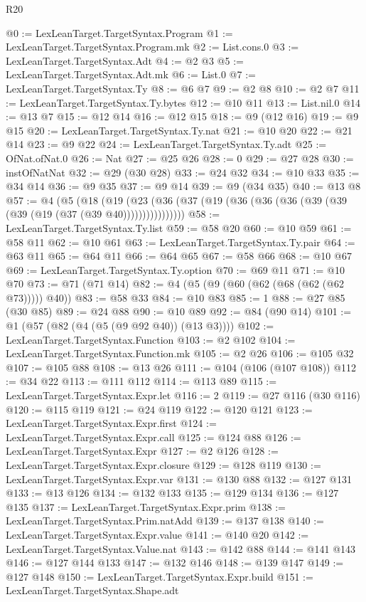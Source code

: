 \begin{lexlean}{R20}
\begin{coremodule}
{{{{{{{{{{{{{{{{{{{{{{{{{{{{{{{{{{{{{{{{{{{{{{{{{{{{{{{{{{{{{{{@0 := LexLeanTarget.TargetSyntax.Program
@1 := LexLeanTarget.TargetSyntax.Program.mk
@2 := List.cons.{0}
@3 := LexLeanTarget.TargetSyntax.Adt
@4 := @2 @3
@5 := LexLeanTarget.TargetSyntax.Adt.mk
@6 := List.{0}
@7 := LexLeanTarget.TargetSyntax.Ty
@8 := @6 @7
@9 := @2 @8
@10 := @2 @7
@11 := LexLeanTarget.TargetSyntax.Ty.bytes
@12 := @10 @11
@13 := List.nil.{0}
@14 := @13 @7
@15 := @12 @14
@16 := @12 @15
@18 := @9 (@12 @16)
@19 := @9 @15
@20 := LexLeanTarget.TargetSyntax.Ty.nat
@21 := @10 @20
@22 := @21 @14
@23 := @9 @22
@24 := LexLeanTarget.TargetSyntax.Ty.adt
@25 := OfNat.ofNat.{0}
@26 := Nat
@27 := @25 @26
@28 := 0
@29 := @27 @28
@30 := instOfNatNat
@32 := @29 (@30 @28)
@33 := @24 @32
@34 := @10 @33
@35 := @34 @14
@36 := @9 @35
@37 := @9 @14
@39 := @9 (@34 @35)
@40 := @13 @8
@57 := @4
    (@5
      (@18 (@19 (@23 (@36 (@37 (@19 (@36 (@36 (@36 (@39 (@39 (@39 (@19 (@37 (@39 @40))))))))))))))))
@58 := LexLeanTarget.TargetSyntax.Ty.list
@59 := @58 @20
@60 := @10 @59
@61 := @58 @11
@62 := @10 @61
@63 := LexLeanTarget.TargetSyntax.Ty.pair
@64 := @63 @11
@65 := @64 @11
@66 := @64 @65
@67 := @58 @66
@68 := @10 @67
@69 := LexLeanTarget.TargetSyntax.Ty.option
@70 := @69 @11
@71 := @10 @70
@73 := @71 (@71 @14)
@82 := @4 (@5 (@9 (@60 (@62 (@68 (@62 (@62 @73))))) @40))
@83 := @58 @33
@84 := @10 @83
@85 := 1
@88 := @27 @85 (@30 @85)
@89 := @24 @88
@90 := @10 @89
@92 := @84 (@90 @14)
@101 := @1 (@57 (@82 (@4 (@5 (@9 @92 @40)) (@13 @3))))
@102 := LexLeanTarget.TargetSyntax.Function
@103 := @2 @102
@104 := LexLeanTarget.TargetSyntax.Function.mk
@105 := @2 @26
@106 := @105 @32
@107 := @105 @88
@108 := @13 @26
@111 := @104 (@106 (@107 @108))
@112 := @34 @22
@113 := @111 @112
@114 := @113 @89
@115 := LexLeanTarget.TargetSyntax.Expr.let
@116 := 2
@119 := @27 @116 (@30 @116)
@120 := @115 @119
@121 := @24 @119
@122 := @120 @121
@123 := LexLeanTarget.TargetSyntax.Expr.first
@124 := LexLeanTarget.TargetSyntax.Expr.call
@125 := @124 @88
@126 := LexLeanTarget.TargetSyntax.Expr
@127 := @2 @126
@128 := LexLeanTarget.TargetSyntax.Expr.closure
@129 := @128 @119
@130 := LexLeanTarget.TargetSyntax.Expr.var
@131 := @130 @88
@132 := @127 @131
@133 := @13 @126
@134 := @132 @133
@135 := @129 @134
@136 := @127 @135
@137 := LexLeanTarget.TargetSyntax.Expr.prim
@138 := LexLeanTarget.TargetSyntax.Prim.natAdd
@139 := @137 @138
@140 := LexLeanTarget.TargetSyntax.Expr.value
@141 := @140 @20
@142 := LexLeanTarget.TargetSyntax.Value.nat
@143 := @142 @88
@144 := @141 @143
@146 := @127 @144 @133
@147 := @132 @146
@148 := @139 @147
@149 := @127 @148
@150 := LexLeanTarget.TargetSyntax.Expr.build
@151 := LexLeanTarget.TargetSyntax.Shape.adt
}}}}}}}}}}}}}}}}}}}}}}}}}}}}}}}}}}}}}}}}}}}}}}}}}}}}}}}}}}}}}}}
\end{coremodule}
\end{lexlean}
